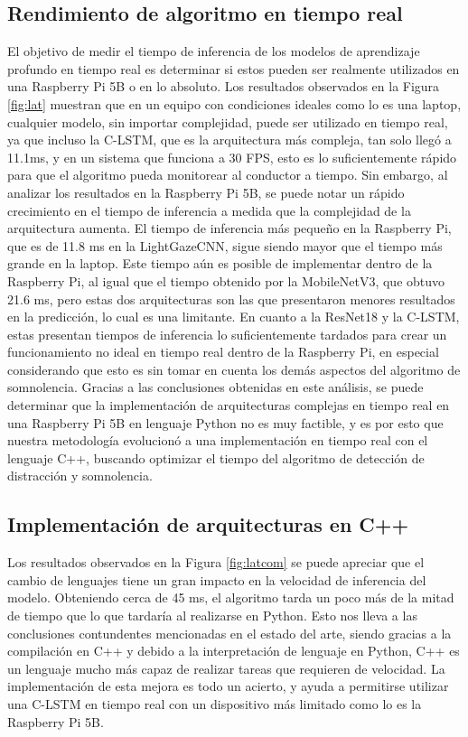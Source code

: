 \subsection{Rendimiento de algoritmo en tiempo real}
El objetivo de medir el tiempo de inferencia de los modelos de aprendizaje profundo en tiempo real es determinar si estos pueden ser realmente utilizados en una Raspberry Pi 5B o en lo absoluto.
Los resultados observados en la Figura \ref{fig:lat} muestran que en un equipo con condiciones ideales como lo es una laptop, cualquier modelo, sin importar complejidad, puede ser utilizado en tiempo real, ya que incluso la C-LSTM, que es la arquitectura más compleja, tan solo llegó a 11.1ms,
y en un sistema que funciona a 30 FPS, esto es lo suficientemente rápido para que el algoritmo pueda monitorear al conductor a tiempo. Sin embargo, al analizar los resultados en la Raspberry Pi 5B, 
se puede notar un rápido crecimiento en el tiempo de inferencia a medida que la complejidad de la arquitectura aumenta. El tiempo de inferencia más pequeño en la Raspberry Pi, que es de 11.8 ms en la LightGazeCNN, sigue siendo mayor que el tiempo más grande en la laptop. 
Este tiempo aún es posible de implementar dentro de la Raspberry Pi, al igual que el tiempo obtenido por la MobileNetV3, que obtuvo 21.6 ms, pero estas dos arquitecturas son las que presentaron menores resultados en la predicción, lo cual es una limitante. 
En cuanto a la ResNet18 y la C-LSTM, estas presentan tiempos de inferencia lo suficientemente tardados para crear un funcionamiento no ideal en tiempo real dentro de la Raspberry Pi, en especial considerando que esto es sin tomar en cuenta los demás aspectos del algoritmo de somnolencia. 
Gracias a las conclusiones obtenidas en este análisis, se puede determinar que la implementación de arquitecturas complejas en tiempo real en una Raspberry Pi 5B en lenguaje Python no es muy factible, y es por esto que nuestra metodología evolucionó a una implementación en tiempo real con el lenguaje C++,
buscando optimizar el tiempo del algoritmo de detección de distracción y somnolencia.

\subsection{Implementación de arquitecturas en C++}
Los resultados observados en la Figura \ref{fig:latcom} se puede apreciar que el cambio de lenguajes tiene un gran impacto en la velocidad de inferencia del modelo. Obteniendo cerca de 45 ms, el algoritmo tarda un poco más de la mitad de tiempo que lo que tardaría al realizarse en Python. Esto nos lleva a las conclusiones contundentes mencionadas en el estado del arte, siendo gracias a la compilación en C++ y debido a la interpretación de lenguaje en Python, C++ es un lenguaje mucho más capaz de realizar tareas que requieren de velocidad. La implementación de esta mejora es todo un acierto, y ayuda a permitirse utilizar una C-LSTM en tiempo real con un dispositivo más limitado como lo es la Raspberry Pi 5B.

